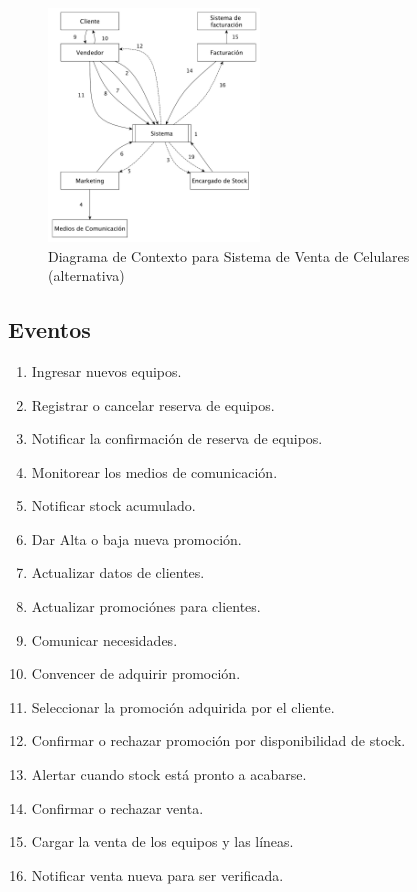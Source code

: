 \begin{figure}[h!]
  \centering
  \includegraphics[width=0.5\textwidth]{./imagenes/contexto_2.pdf}
  \caption{Diagrama de Contexto para Sistema de Venta de Celulares (alternativa)}
\end{figure}

\subsection{Eventos}

\begin{enumerate}

  \item Ingresar nuevos equipos.
  \item Registrar o cancelar reserva de equipos.
  \item Notificar la confirmación de reserva de equipos.
  \item Monitorear los medios de comunicación.
  \item Notificar stock acumulado.
  \item Dar Alta o baja nueva promoción.
  \item Actualizar datos de clientes.
  \item Actualizar promociónes para clientes.
  \item Comunicar necesidades.
  \item Convencer de adquirir promoción.
  \item Seleccionar la promoción adquirida por el cliente.
  \item Confirmar o rechazar promoción por disponibilidad de stock.
  \item Alertar cuando stock está pronto a acabarse.
  \item Confirmar o rechazar venta.
  \item Cargar la venta de los equipos y las líneas.
  \item Notificar venta nueva para ser verificada.

\end{enumerate}


